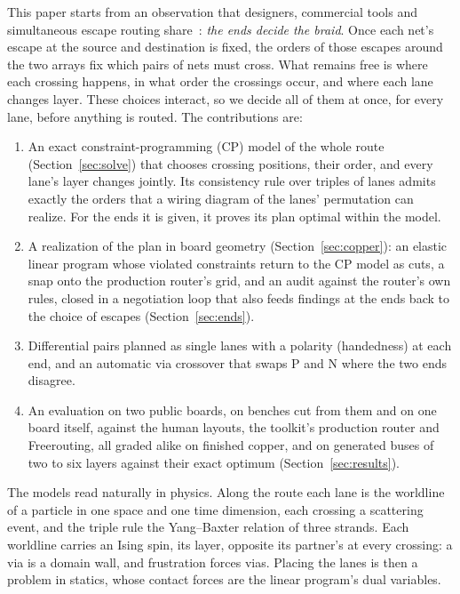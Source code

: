 \documentclass[journal]{IEEEtran}
\begin{document}
This paper starts from an observation that designers, commercial tools and simultaneous escape routing share~\cite{cadence2015,ozdal2006ser}: \emph{the ends decide the braid}. Once each net's escape at the source and destination is fixed, the orders of those escapes around the two arrays fix which pairs of nets must cross. What remains free is where each crossing happens, in what order the crossings occur, and where each lane changes layer. These choices interact, so we decide all of them at once, for every lane, before anything is routed. The contributions are:
\begin{enumerate}
\item An exact constraint-programming (CP) model of the whole route (Section~\ref{sec:solve}) that chooses crossing positions, their order, and every lane's layer changes jointly. Its consistency rule over triples of lanes admits exactly the orders that a wiring diagram of the lanes' permutation can realize. For the ends it is given, it proves its plan optimal within the model.
\item A realization of the plan in board geometry (Section~\ref{sec:copper}): an elastic linear program whose violated constraints return to the CP model as cuts, a snap onto the production router's grid, and an audit against the router's own rules, closed in a negotiation loop that also feeds findings at the ends back to the choice of escapes (Section~\ref{sec:ends}).
\item Differential pairs planned as single lanes with a polarity (handedness) at each end, and an automatic via crossover that swaps P and N where the two ends disagree.
\item An evaluation on two public boards, on benches cut from them and on one board itself, against the human layouts, the toolkit's production router and Freerouting, all graded alike on finished copper, and on generated buses of two to six layers against their exact optimum (Section~\ref{sec:results}).
\end{enumerate}

The models read naturally in physics. Along the route each lane is the worldline of a particle in one space and one time dimension, each crossing a scattering event, and the triple rule the Yang--Baxter relation of three strands. Each worldline carries an Ising spin, its layer, opposite its partner's at every crossing: a via is a domain wall, and frustration forces vias. Placing the lanes is then a problem in statics, whose contact forces are the linear program's dual variables.
\end{document}
